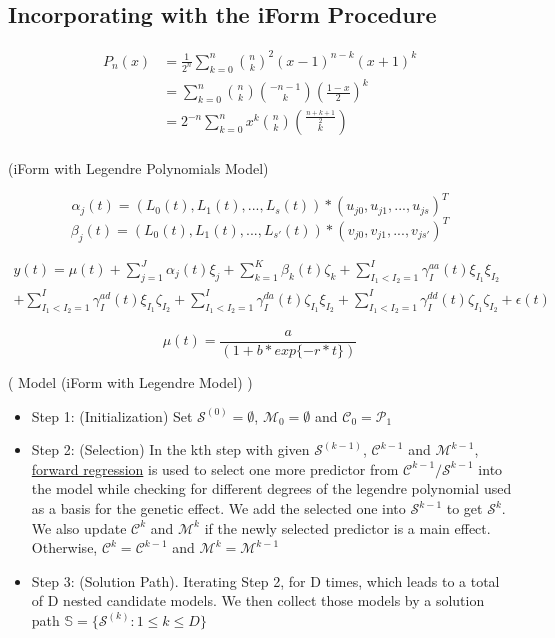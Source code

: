 \documentclass[11pt,]{book}
\providecommand{\tightlist}{%
  \setlength{\itemsep}{0pt}\setlength{\parskip}{0pt}}
\theoremstyle{definition}
\theoremstyle{definition}
\theoremstyle{remark}
\begin{document}
\subsection{Incorporating with the iForm
Procedure}\label{incorporating-with-the-iform-procedure}

\[
\begin{equation}
\begin{split}
P_n(x) & = \frac{1}{2^n}\sum_{k=0}^{n}{{n}\choose{k}}^2(x-1)^{n-k}(x+1)^k \\
& = \sum_{k=0}^{n}{{n}\choose{k}}{{-n-1}\choose{k}}{\left(\frac{1-x}{2}\right)}^k \\
& = 2^{-n}\sum_{k=0}^{n} x^k {{n}\choose{k}}{{\frac{n+k+1}{2}}\choose{k}} \\
\end{split}
\end{equation}
\]

(iForm with Legendre Polynomials Model)

\[\alpha_j(t) = (L_0(t), L_1(t), ... , L_s(t))*(u_{j0}, u_{j1},...,u_{js})^T\]
\[\beta_j(t) = (L_0(t), L_1(t), ... , L_{s'}(t))*(v_{j0}, v_{j1},...,v_{js'})^T\]

\[
\begin{equation}
\begin{split}
y(t) = \mu(t) + \sum_{j=1}^{J}\alpha_j(t)\xi_j + \sum_{k=1}^{K}\beta_k(t)\zeta_k + \sum_{I_1 \lt I_2=1}^{I}\gamma_I^{aa}(t) \xi_{I_1}\xi_{I_2} \\ 
+ \sum_{I_1 \lt I_2=1}^{I}\gamma_I^{ad}(t) \xi_{I_1}\zeta_{I_2} + \sum_{I_1 \lt I_2=1}^{I} \gamma_I^{da}(t) \zeta_{I_1}\xi_{I_2} + \sum_{I_1 \lt I_2=1}^{I} \gamma_I^{dd}(t)\zeta_{I_1}\zeta_{I_2} + \epsilon(t)
\end{split}
\end{equation}
\]

\[\mu(t)=\frac{a}{(1+b*exp\{-r*t\})}\]

( Model (iForm with Legendre Model) )

\begin{itemize}
\tightlist
\item
  Step 1: (Initialization) Set \(\mathcal{S}^{(0)} = \emptyset\),
  \(\mathcal{M}_0 = \emptyset\) and \(\mathcal{C}_0 = \mathcal{P_1}\)
\item
  Step 2: (Selection) In the kth step with given
  \(\mathcal{S}^{(k-1)}\), \(\mathcal{C}^{k−1}\) and
  \(\mathcal{M}^{k−1}\), \protect\hyperlink{ux2f7}{forward regression}
  is used to select one more predictor from
  \(\mathcal{C}^{k−1}/ \mathcal{S}^{k−1}\) into the model while checking
  for different degrees of the legendre polynomial used as a basis for
  the genetic effect. We add the selected one into \(\mathcal{S}^{k−1}\)
  to get \(\mathcal{S}^k\). We also update \(\mathcal{C}^k\) and
  \(\mathcal{M}^k\) if the newly selected predictor is a main effect.
  Otherwise, \(\mathcal{C}^k = \mathcal{C}^{k−1}\) and
  \(\mathcal{M}^k = \mathcal{M}^{k−1}\)
\item
  Step 3: (Solution Path). Iterating Step 2, for D times, which leads to
  a total of D nested candidate models. We then collect those models by
  a solution path \(\mathbb{S}=\{\mathcal{S}^{(k)}: 1 \le k \le D\}\)
\end{itemize}
\end{document}
